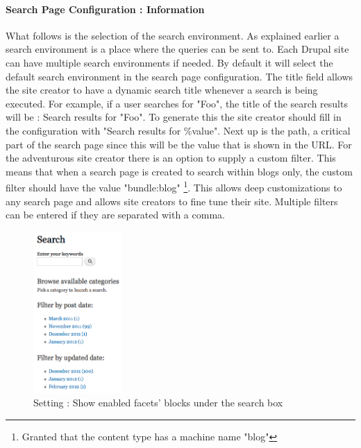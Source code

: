 \paragraph{Search Page Configuration :  Information} What follows is the selection of the search environment. As explained earlier a search environment is a place where the queries can be sent to. Each Drupal site can have multiple search environments if needed. By default it will select the default search environment in the search page configuration. The title field allows the site creator to have a dynamic search title whenever a search is being executed. For example, if a user searches for "Foo", the title of the search results will be : Search results for "Foo". To generate this the site creator should fill in the configuration with "Search results for \%value". Next up is the path, a critical part of the search page since this will be the value that is shown in the URL. For the adventurous site creator there is an option to supply a custom filter. This means that when a search page is created to search within blogs only, the custom filter should have the value "bundle:blog" \footnote{Granted that the content type has a machine name "blog"}. This allows deep customizations to any search page and allows site creators to fine tune their site. Multiple filters can be entered if they are separated with a comma.

\begin{figure}
\begin{center}
     \includegraphics[width=0.3\textwidth]{images/implementation/blocks_under_search_box.png}
     \caption{Setting : Show enabled facets' blocks under the search box}
\end{center}
\end{figure}
